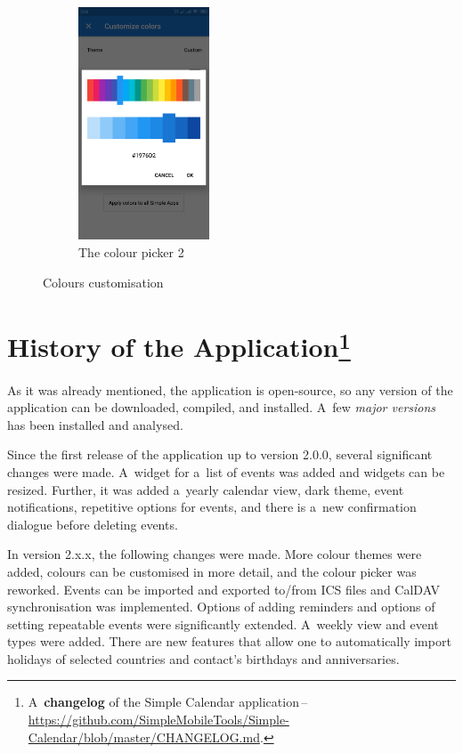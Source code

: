 \documentclass[a4paper, 11pt]{article}
\begin{document}
\begin{figure}[ht]
\begin{subfigure}{.32 \textwidth}
			\centering
			\includegraphics[width=10.5em, frame]{img/color_picker_2.png}
			\caption{The colour picker 2}
		\end{subfigure}

		\caption{Colours customisation}
		\label{fig:colours}
	\end{figure}


	\section{
		\texorpdfstring{
			History of the Application\protect\footnote{%
				A~\textbf{changelog} of the Simple Calendar application\,--\,%
				\url{https://github.com/SimpleMobileTools/Simple-Calendar/blob/master/CHANGELOG.md}.
			}
		}{History of the Application}
	}
	\label{sec:history}

	As it was already mentioned, the application is open-source, so
	any version of the application can be downloaded, compiled, and
	installed. A~few \emph{major versions} has been installed and analysed.

	Since the first release of the application up to version 2.0.0,
	several significant changes were made. A~widget for a~list of
	events was added and widgets can be resized. Further, it was
	added a~yearly calendar view, dark theme, event notifications,
	repetitive options for events, and there is a~new confirmation
	dialogue before deleting events.

	In version 2.x.x, the following changes were made. More colour
	themes were added, colours can be customised in more detail,
	and the  colour picker was reworked. Events can be imported and 
	exported to/from ICS files and CalDAV synchronisation was implemented.
	Options of adding reminders and options of setting repeatable events
	were significantly extended. A~weekly view and event types were
	added. There are new features that allow one to automatically
	import holidays of selected countries and contact's birthdays
	and anniversaries.
\end{document}
